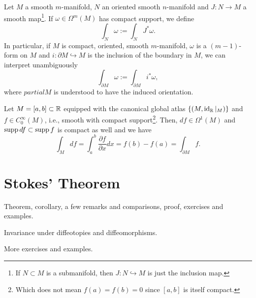 \begin{definition}
  Let $M$ a smooth $m$-manifold, $N$ an oriented smooth $n$-manifold and $J:N\to M$ a smooth map\footnote{If $N\subset M$ is a submanifold, then $J:N\hookrightarrow M$ is just the inclusion map.}.
  If $\omega\in\Omega^m(M)$ has compact support, we define
  \begin{equation}
    \int_N \omega := \int_N J^*\omega.
  \end{equation}
  In particular, if $M$ is compact, oriented, smooth $m$-manifold, $\omega$ is a $(m-1)$-form on $M$ and $i:\partial M\hookrightarrow M$ is the inclusion of the boundary in $M$, we can interpret unambiguously
  \begin{equation}
    \int_{\partial M} \omega := \int_{\partial M} i^* \omega,
  \end{equation}
  where $partial M$ is understood to have the induced orientation.
\end{definition}

\begin{example}
  Let $M=[a,b]\subset \mathbb{R}$ equipped with the canonical global atlas $\{(M, \operatorname{id}_{\mathbb{R}}|_M)\}$ and $f\in C^\infty_0(M)$, i.e., smooth with compact support\footnote{Which does not mean $f(a) = f(b)=0$ since $[a,b]$ is itself compact.}.
  Then, $df\in\Omega^1(M)$ and $\operatorname{supp} df \subset \operatorname{supp} f$ is compact as well and we have
  \begin{equation}
    \int_M df = \int_a^b \frac{\partial f}{\partial x} dx = f(b)- f(a) = \int_{\partial M} f.
  \end{equation}
\end{example}

\begin{exercise}
  
\end{exercise}

\section{Stokes' Theorem}

Theorem, corollary, a few remarks and comparisons, proof, exercises and examples.

Invariance under diffeotopies and diffeomorphisms.

More exercises and examples.